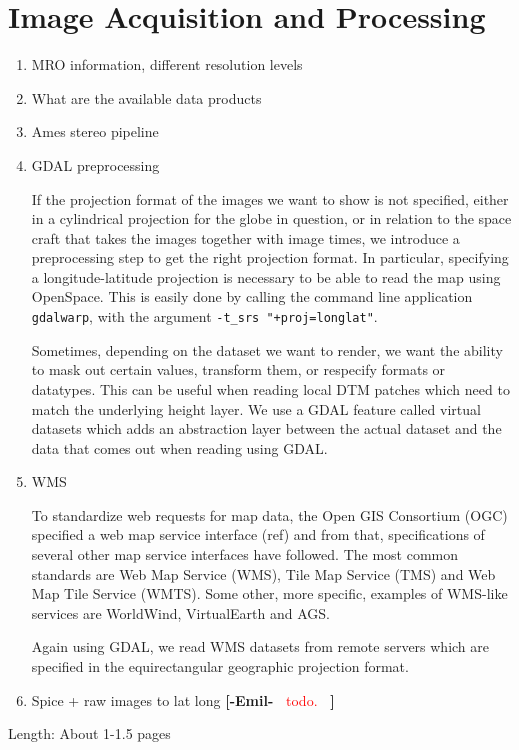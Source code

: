 \documentclass[journal]{vgtc}                %
\newcommand{\emilcomment}[1]{\textbf{[-Emil-~}
    \textcolor{red}{#1}
    \textbf{~]}}
\begin{document}
\section{Image Acquisition and Processing} \label{sec:imageacquisitionprocessing}
\begin{enumerate}
  \item MRO information, different resolution levels
  \item What are the available data products
  \item Ames stereo pipeline
  \item GDAL preprocessing


If the projection format of the images we want to show is not specified, either in a cylindrical projection for the globe in question, or in relation to the space craft that takes the images together with image times, we introduce a preprocessing step to get the right projection format.
In particular, specifying a longitude-latitude projection is necessary to be able to read the map using OpenSpace.
This is easily done by calling the command line application \texttt{gdalwarp}, with the argument \texttt{-t\_srs "+proj=longlat"}.

Sometimes, depending on the dataset we want to render, we want the ability to mask out certain values, transform them, or respecify formats or datatypes.
This can be useful when reading local DTM patches which need to match the underlying height layer.
We use a GDAL feature called virtual datasets which adds an abstraction layer between the actual dataset and the data that comes out when reading using GDAL.

\item WMS

To standardize web requests for map data, the Open GIS Consortium (OGC) specified a web map service interface (ref) and from that, specifications of several other map service interfaces have followed.
The most common standards are Web Map Service (WMS), Tile Map Service (TMS) and Web Map Tile Service (WMTS). Some other, more specific, examples of WMS-like services are WorldWind, VirtualEarth and AGS.

Again using GDAL, we read WMS datasets from remote servers which are specified in the equirectangular geographic projection format.
  
  \item Spice + raw images to lat long \emilcomment{todo.}
\end{enumerate}
Length: About 1-1.5 pages
\end{document}
